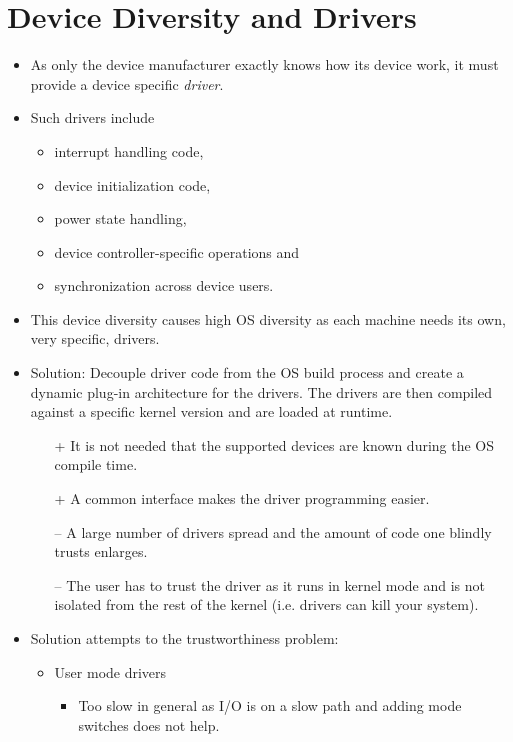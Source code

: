     \section{Device Diversity and Drivers}
        \begin{itemize}
        	\item As only the device manufacturer exactly knows how its device work, it must provide a device specific \textit{driver}.
        	\item Such drivers include
            	\begin{itemize}
            		\item interrupt handling code,
            		\item device initialization code,
            		\item power state handling,
            		\item device controller-specific operations and
            		\item synchronization across device users.
            	\end{itemize}
        	\item This device diversity causes high OS diversity as each machine needs its own, very specific, drivers.
        	\item Solution: Decouple driver code from the OS build process and create a dynamic plug-in architecture for the drivers. The drivers are then compiled against a specific kernel version and are loaded at runtime.
        		\begin{itemize}
        			\item[+] It is not needed that the supported devices are known during the OS compile time.
        			\item[+] A common interface makes the driver programming easier.
        			\item[--] A large number of drivers spread and the amount of code one blindly trusts enlarges.
        			\item[--] The user has to trust the driver as it runs in kernel mode and is not isolated from the rest of the kernel (i.e. drivers can kill your system).
        		\end{itemize}
        	\item Solution attempts to the trustworthiness problem:
            	\begin{itemize}
            		\item User mode drivers
	            		\begin{itemize}
	            			\item Too slow in general as I/O is on a slow path and adding mode switches does not help.

\end{itemize}
\end{itemize}
\end{itemize}
